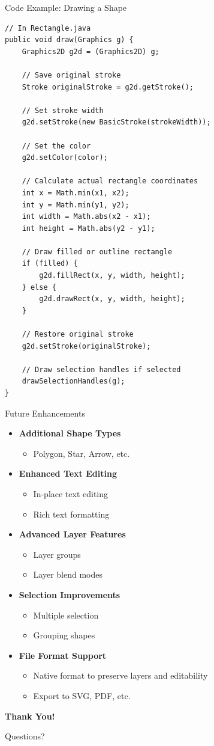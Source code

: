 \documentclass{beamer}
\begin{document}
\begin{frame}[fragile]{Code Example: Drawing a Shape}
\begin{verbatim}
// In Rectangle.java
public void draw(Graphics g) {
    Graphics2D g2d = (Graphics2D) g;
    
    // Save original stroke
    Stroke originalStroke = g2d.getStroke();
    
    // Set stroke width
    g2d.setStroke(new BasicStroke(strokeWidth));
    
    // Set the color
    g2d.setColor(color);
    
    // Calculate actual rectangle coordinates
    int x = Math.min(x1, x2);
    int y = Math.min(y1, y2);
    int width = Math.abs(x2 - x1);
    int height = Math.abs(y2 - y1);
    
    // Draw filled or outline rectangle
    if (filled) {
        g2d.fillRect(x, y, width, height);
    } else {
        g2d.drawRect(x, y, width, height);
    }
    
    // Restore original stroke
    g2d.setStroke(originalStroke);
    
    // Draw selection handles if selected
    drawSelectionHandles(g);
}
\end{verbatim}
\end{frame}

\begin{frame}{Future Enhancements}
\begin{itemize}
\item \textbf{Additional Shape Types}
  \begin{itemize}
  \item Polygon, Star, Arrow, etc.
  \end{itemize}
\item \textbf{Enhanced Text Editing}
  \begin{itemize}
  \item In-place text editing
  \item Rich text formatting
  \end{itemize}
\item \textbf{Advanced Layer Features}
  \begin{itemize}
  \item Layer groups
  \item Layer blend modes
  \end{itemize}
\item \textbf{Selection Improvements}
  \begin{itemize}
  \item Multiple selection
  \item Grouping shapes
  \end{itemize}
\item \textbf{File Format Support}
  \begin{itemize}
  \item Native format to preserve layers and editability
  \item Export to SVG, PDF, etc.
  \end{itemize}
\end{itemize}
\end{frame}

\begin{frame}{}
  \begin{center}
    \large{\textbf{Thank You!}}
    
    \normalsize{Questions?}
  \end{center}
\end{frame}
\end{document}
